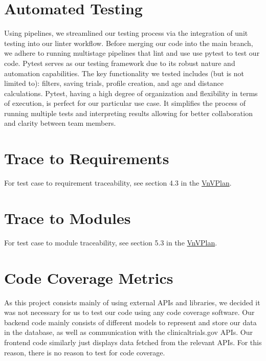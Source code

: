 \documentclass[12pt, titlepage]{article}
\begin{document}
\section{Automated Testing}
Using pipelines, we streamlined our testing process via the integration of unit 
testing into our linter workflow. Before merging our code into the main branch, we adhere
to running multistage pipelines that lint and use use pytest to test our code.
Pytest serves as our testing framework
due to its robust nature and automation capabilities. The key functionality we tested includes (but is not limited to):
filters, saving trials, profile creation, and age and distance calculations. Pytest, having a high degree of organization and flexibility 
in terms of execution, is perfect
for our particular use case. It simplifies the process of running multiple tests and interpreting results
allowing for better collaboration and clarity between team members. 


\section{Trace to Requirements}

For test case to requirement traceability, see section 4.3 in the \href{https://github.com/davimang/REACH/blob/main/docs/VnVPlan/VnVPlan.pdf}{VnVPlan}.
\section{Trace to Modules}		
For test case to module traceability, see section 5.3 in the \href{https://github.com/davimang/REACH/blob/main/docs/VnVPlan/VnVPlan.pdf}{VnVPlan}.

\section{Code Coverage Metrics}

As this project consists mainly of using external APIs and libraries, we decided it was not necessary 
for us to test our code using any code coverage software. Our backend code mainly consists of different 
models to represent and store our data in the database, as well as communication with the clinicaltrials.gov APIs.
Our frontend code similarly just displays data fetched from the relevant APIs. For this reason, there is no 
reason to test for code coverage.


%

\newpage{}
\end{document}
